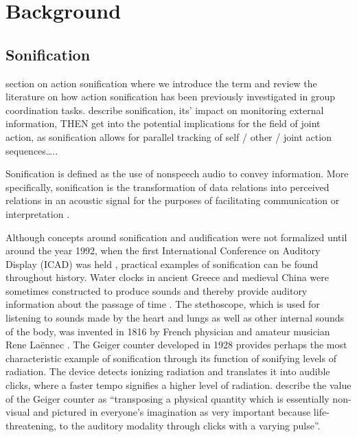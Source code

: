 \documentclass[10pt,a4paper,onecolumn]{article}
\begin{document}
\hypertarget{background}{%
\section{Background}\label{background}}

\hypertarget{sonification}{%
\subsection{Sonification}\label{sonification}}

section on action sonification where we introduce the term and review the literature on how action sonification has been previously investigated in group coordination tasks.
describe sonification, its' impact on monitoring external information, THEN get into the potential implications for the field of joint action, as sonification allows for parallel tracking of self / other / joint action sequences\ldots..

Sonification is defined as the use of nonspeech audio to convey information. More specifically, sonification is the transformation of data relations into perceived relations in an acoustic signal for the purposes of facilitating communication or interpretation \autocite[p.~4]{kramerSonificationReportStatus1999}.

Although concepts around sonification and audification were not formalized until around the year 1992, when the first International Conference on Auditory Display (ICAD) was held \autocite{dubusSonificationPhysicalQuantities2011}, practical examples of sonification can be found throughout history. Water clocks in ancient Greece and medieval China were sometimes constructed to produce sounds and thereby provide auditory information about the passage of time \autocite{dubusSonificationPhysicalQuantities2011}. The stethoscope, which is used for listening to sounds made by the heart and lungs as well as other internal sounds of the body, was invented in 1816 by French physician and amateur musician Rene Laënnec \autocite{roguinReneTheophileHyacinthe2006}. The Geiger counter developed in 1928 provides perhaps the most characteristic example of sonification through its function of sonifying levels of radiation. The device detects ionizing radiation and translates it into audible clicks, where a faster tempo signifies a higher level of radiation. \autocite{dubusSonificationPhysicalQuantities2011} describe the value of the Geiger counter as ``transposing a physical quantity which is essentially non-visual and pictured in everyone's imagination as very important because life-threatening, to the auditory modality through clicks with a varying pulse''.
\end{document}
